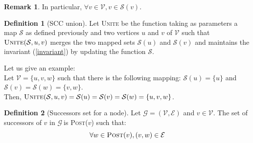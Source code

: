 \documentclass[a4 paper, 12pt]{article}
\theoremstyle{definition}
\def\GG{$\mathcal{G}~$}
\newtheorem{definition}{Definition}
\newtheorem{remark}{Remark}
\begin{document}
\begin{remark}
    In particular, $\forall v \in \mathcal{V}, v \in \mathcal{S}(v)$.
\end{remark}

\begin{definition}[SCC union]
    Let \textsc{Unite} be the function taking as parameters a map $\mathcal{S}$ as defined previously and two vertices $u$ and $v$ of $\mathcal{V}$ such that $\textsc{Unite}(\mathcal{S}, u, v)$ merges the two mapped sets $\mathcal{S}(u)$ and $\mathcal{S}(v)$ and maintains the invariant (\ref{invariant}) by updating the function $\mathcal{S}$.
\end{definition}
Let us give an example:\\
Let $\mathcal{V} = \{u,v,w\}$ such that there is the following mapping: $\mathcal{S}(u) = \{u\}$ and $\mathcal{S}(v) = \mathcal{S}(w) = \{v,w\}$.\\
Then, $\textsc{Unite}(\mathcal{S}, u, v) = \mathcal{S}(u) = \mathcal{S}(v) = \mathcal{S}(w) = \{u,v,w\}$.

\begin{definition}[Successors set for a node]
    Let $\mathcal{G} = (\mathcal{V}, \mathcal{E})$ and $v \in \mathcal{V}$. The set of successors of $v$ in \GG is \textsc{Post}($v$) such that:
    \begin{equation*}
        \forall w\in \textsc{Post}(v), (v,w)\in \mathcal{E}
    \end{equation*}
\end{definition}
\end{document}
